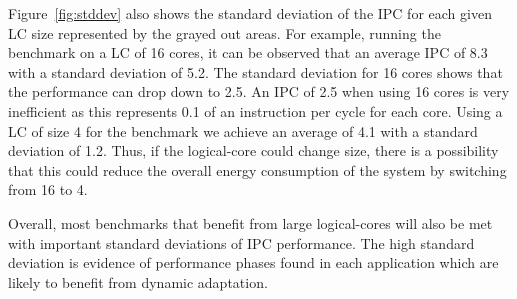 Figure~\ref{fig:stddev} also shows the standard deviation of the IPC for each given LC size represented by the grayed out areas.
For example, running the  benchmark on a LC of 16 cores, it can be observed that an average IPC of 8.3 with a standard deviation of 5.2.
The standard deviation for 16 cores shows that the performance can drop down to 2.5.
An IPC of 2.5 when using 16 cores is very inefficient as this represents 0.1 of an instruction per cycle for each core.
Using a LC of size 4 for the  benchmark we achieve an average of 4.1 with a standard deviation of 1.2.
Thus, if the logical-core could change size, there is a possibility that this could reduce the overall energy consumption of the system by switching from 16 to 4.

Overall, most benchmarks that benefit from large logical-cores will also be met with important standard deviations of IPC performance.
The high standard deviation is evidence of performance phases found in each application which are likely to benefit from dynamic adaptation.
